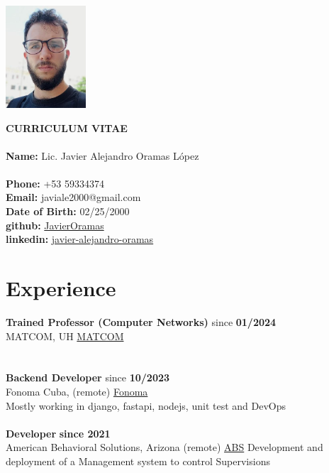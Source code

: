 \documentclass{article}
\begin{document}
\pagestyle{empty} %

\begin{center}
    \begin{minipage}[t]{0.2\textwidth}
        \vspace{0pt}
        \includegraphics[width=3cm]{img.png}
    \end{minipage}
    \hspace{1cm}
    \begin{minipage}[t]{0.7\textwidth}
        \vspace{0pt}
        \textbf{CURRICULUM VITAE}\\\\
        \textbf{Name:} Lic. Javier Alejandro Oramas López\\
        \\
        \textbf{Phone:} +53 59334374 \\
        \textbf{Email:} javiale2000@gmail.com \\
        \textbf{Date of Birth:}  02/25/2000\\
        \textbf{github:} \href{https://github.com/JavierOramas}{JavierOramas} \\
        \textbf{linkedin:} \href{https://www.linkedin.com/in/javier-alejandro-oramas-l%C3%B3pez-7ab47b160/}{javier-alejandro-oramas} \\
    \end{minipage}
\end{center}

\section*{Experience}
    \textbf{Trained Professor (Computer Networks)} \hfill since \textbf{01/2024}\\ 
    MATCOM, UH
    \href{matcom.uh.cu}{MATCOM}\\
    \\
    \vspace{0.1cm}\\
    \textbf{Backend Developer} \hfill since \textbf{10/2023}\\ 
    Fonoma Cuba, (remote)
    \href{fonoma.com}{Fonoma}\\
    Mostly working in django, fastapi, nodejs, unit test and DevOps\\
    \vspace{0.1cm}\\
    \textbf{Developer} \hfill \textbf{since 2021}\\ 
    American Behavioral Solutions, Arizona (remote)
    \href{americanbehavioralsolutions.com}{ABS}
    Development and deployment of a Management system to control Supervisions
\end{document}
